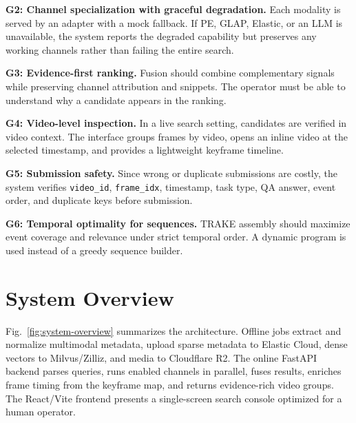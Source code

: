 \documentclass[conference]{IEEEtran}
\newcommand{\vid}{\texttt{video\_id}}
\newcommand{\fid}{\texttt{frame\_idx}}
\begin{document}
\textbf{G2: Channel specialization with graceful degradation.} Each modality is
served by an adapter with a mock fallback. If PE, GLAP, Elastic, or an LLM is
unavailable, the system reports the degraded capability but preserves any
working channels rather than failing the entire search.

\textbf{G3: Evidence-first ranking.} Fusion should combine complementary
signals while preserving channel attribution and snippets. The operator must be
able to understand why a candidate appears in the ranking.

\textbf{G4: Video-level inspection.} In a live search setting, candidates are
verified in video context. The interface groups frames by video, opens an inline
video at the selected timestamp, and provides a lightweight keyframe timeline.

\textbf{G5: Submission safety.} Since wrong or duplicate submissions are costly,
the system verifies \vid{}, \fid{}, timestamp, task type, QA answer, event order,
and duplicate keys before submission.

\textbf{G6: Temporal optimality for sequences.} TRAKE assembly should maximize
event coverage and relevance under strict temporal order. A dynamic program is
used instead of a greedy sequence builder.

\section{System Overview}

Fig.~\ref{fig:system-overview} summarizes the architecture. Offline jobs extract
and normalize multimodal metadata, upload sparse metadata to Elastic Cloud,
dense vectors to Milvus/Zilliz, and media to Cloudflare R2. The online FastAPI
backend parses queries, runs enabled channels in parallel, fuses results, enriches
frame timing from the keyframe map, and returns evidence-rich video groups. The
React/Vite frontend presents a single-screen search console optimized for a
human operator.
\end{document}
